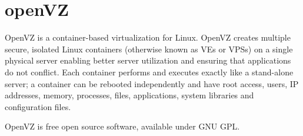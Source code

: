 \section{openVZ}
OpenVZ is a container-based virtualization for Linux. OpenVZ creates multiple
secure, isolated Linux containers (otherwise known as VEs or VPSs) on a single
physical server enabling better server utilization and ensuring that
applications do not conflict. Each container performs and executes exactly
like a stand-alone server; a container can be rebooted independently and have
root access, users, IP addresses, memory, processes, files, applications,
system libraries and configuration files.

OpenVZ is free open source software, available under GNU GPL\cite{www-openvz}. 

